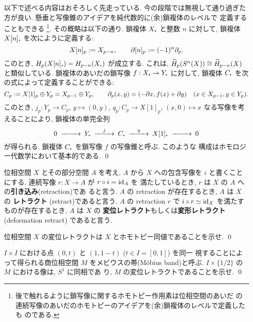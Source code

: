 \documentclass[12pt,twoside]{jarticle}
\begin{document}
\begin{guide}
  以下で述べる内容はおそろしく先走っている.
  今の段階では無視して通り過ぎた方が良い.
  懸垂と写像錐のアイデアを純代数的に(余)鎖複体のレベルで
  定義することもできる%
  \footnote{後で触れるように鎖写像に関するホモトピー作用素は位相空間のあいだ
    の連続写像のあいだのホモトピーのアイデアを(余)鎖複体のレベルで定義したも
    のである.}. %
  その概略は以下の通り.  鎖複体 $X_\bcdot$ と整数 $n$ に対して, 鎖複体 
  $X[n]_\bcdot$ を次にように定義する:
  \[
    X[n]_p := X_{p-n},
    \qquad
    \partial[n]_p := (-1)^n \partial_p.
  \] %
  このとき, $H_p(X[n]_\bcdot)=H_{p-n}(X_\bcdot)$ が成立する. これは,
  $\widetilde{H}_p(S^n(X))\cong\widetilde{H}_{p-n}(X)$ と類似している. 
  鎖複体のあいだの鎖写像 $f : X_\bcdot \to Y_\bcdot$ に対して, 鎖複体 
  $C_\bcdot$ を次の式によって定義することができる:
  \[
    C_p := X[1]_p\oplus Y_p = X_{p-1}\oplus Y_p,
    \qquad
    \partial_p(x,y)=(-\partial x, f(x)+\partial y)
    \quad (x\in X_{p-1}, y\in Y_p).
  \]
  このとき, $j_p : Y_p \to C_p$, $y\mapsto (0,y)$, %
  $q_p : C_p \to X[1]_p$, $(x,0)\mapsto x$ なる写像を考えることにより, 
  鎖複体の単完全列
  \begin{equation*}
  \begin{CD}
    0 @>>> Y_\bcdot @>j>> C_\bcdot @>q>> X[1]_\bcdot @>>> 0
  \end{CD}
  \end{equation*}
  が得られる. 鎖複体 $C_\bcdot$ を鎖写像 $f$ の写像錐と呼ぶ. このような
  構成はホモロジー代数学において基本的である. 
  \qed
\end{guide}

位相空間 $X$ とその部分空間 $A$ を考え, $A$ から $X$ への包含写像を %
$i$ と書くことにする. 連続写像 $r : X \to A$ が $r\circ i = \mathop{\mathrm{id}}\nolimits_A$ を
満たしているとき, $r$ は $X$ の $A$ への{\bf 引き込み}(retraction)であ
ると言う. $A$ の retraction が存在するとき, $A$ は $X$ の%
{\bf レトラクト} (retract)であると言う. $A$ の retraction $r$ で 
$i\circ r\simeq\mathop{\mathrm{id}}\nolimits_X$ を満たすものが存在するとき, $A$ は $X$ の%
{\bf 変位レトラクト}もしくは{\bf 変形レトラクト}(deformation retract)
であると言う.

\begin{question}\qstar{*}
  位相空間 $X$ の変位レトラクトは $X$ とホモトピー同値であることを示せ. 
  \qed
\end{question}

\begin{question}\qstar{*}
  $I\times I$ における点 $(0,t)$ と $(1,1-t)$ ($t\in I=[0,1]$) を同一
  視することによって得られる商位相空間 $M$ をメビウスの帯(M\"obius
  band)と呼ぶ. $I\times\{1/2\}$ の $M$ における像は, $S^1$ に同相であ
  り, $M$ の変位レトラクトであることを示せ. \qed
\end{question}
\end{document}
